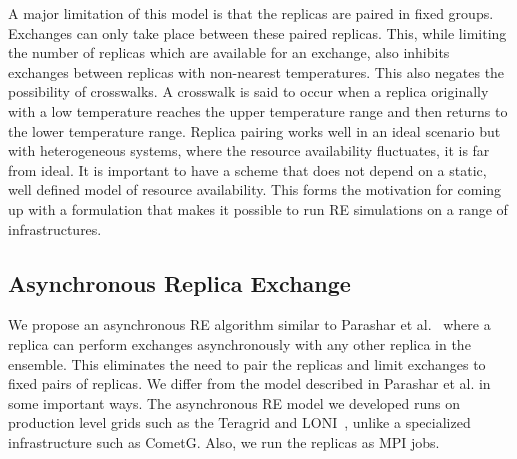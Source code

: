 \documentclass[a4paper,10pt]{article}
\newcommand{\jhanote}[1]{ {\textcolor{red} { ***shantenu: #1 }}}
\newcommand{\athotanote}[1]{ {\textcolor{green} { ***athota: #1 }}}
\newcommand{\jhanote}[1]{}
\newcommand{\athotanote}[1]{}
\begin{document}
A major limitation of this model is that the replicas are paired in fixed groups. 
Exchanges can only take place between these paired replicas.
This, while limiting the number of replicas which are available for an exchange, also inhibits exchanges between replicas with non-nearest temperatures.%
This also negates the possibility of crosswalks. A crosswalk is said to occur when a replica originally with a low temperature reaches the upper temperature range and then returns to the lower temperature range. %
Replica pairing works well in an ideal scenario but with heterogeneous systems, 
where the resource availability fluctuates, it is far from ideal. It is 
important to have a scheme that does not depend on a static, well defined 
model of resource availability. This forms the motivation for coming up 
with a formulation that makes it possible to run RE simulations on a range of infrastructures.

  

  
\subsection{Asynchronous Replica Exchange}

We propose an asynchronous RE algorithm similar to Parashar et al.~\cite{parashar_arepex}
where a replica can perform exchanges asynchronously with any other replica in the ensemble. This eliminates the need to pair the replicas and limit exchanges to fixed pairs of replicas. We differ from the model described in Parashar et al. in some important ways. The asynchronous RE model we developed runs on production level grids such as the Teragrid and LONI~\cite{LONI_web}, unlike a specialized infrastructure such as CometG. Also, we run the replicas as MPI jobs.
\end{document}
